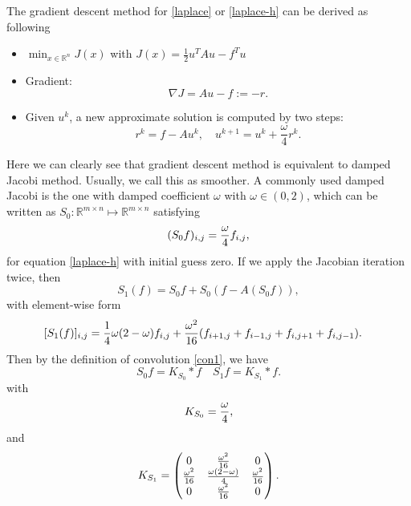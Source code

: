The gradient descent method for \eqref{laplace} or \eqref{laplace-h} can be derived as following 
\begin{itemize}
	\item $\min_{x\in \mathbb{R}^n} J(x)$ with $ J(x) =
          \frac{1}{2}u^TA u - f^Tu$ 
	\item Gradient:
	$$
	\nabla J= Au - f := - r.
	$$
	\item Given $u^k$, a new approximate solution is computed by two steps:
	$$
	r^k = f-Au^k,\quad u^{k+1} = u^k + \frac{\omega}{4} r^k.
	$$
\end{itemize}
Here we can clearly see that gradient descent method is equivalent to damped Jacobi method. Usually, we call this as 
smoother. A commonly used 
damped Jacobi is the one with damped coefficient $\omega$ with $\omega \in (0,2)$,  
which can be written as $S_{0}:\mathbb R^{m\times n}\mapsto
\mathbb R^{m\times n}$ satisfying
\begin{equation}
\label{jacobi1}
(S_{0}f)_{i,j}={\omega\over 4}f_{i,j},
\end{equation}
for equation \eqref{laplace-h} with initial guess zero.
If we apply the Jacobian iteration twice, then
$$
S_1(f) = S_{0} f + S_0(f - A(S_{0}f)),
$$
with element-wise form
\begin{equation} 
\begin{aligned}
\label{jacobi2}
[S_1(f)]_{i,j} &={1\over 4}\omega(2-\omega)f_{i,j} + {\omega^2\over 16}(f_{i+1,j}+f_{i-1,j}+f_{i,j+1}+f_{i,j-1}).
\end{aligned}
\end{equation}
Then by the definition of convolution \eqref{con1}, we have
 \begin{equation}\label{eq:convS}
S_{0}f = K_{S_{0}} \ast f \quad S_1 f = K_{S_1} \ast f.
\end{equation}
with
\begin{equation}\label{eq:kernel-S}
K_{S_{0}} = {\omega \over 4},
\end{equation}
and 
\begin{equation}\label{eq:kernel-S2}
K_{S_1} = \begin{pmatrix}
0 & \frac{\omega^2}{16} & 0 \\
\frac{\omega^2}{16} & {\omega(2-\omega) \over 4} & \frac{\omega^2}{16}  \\
0 & \frac{\omega^2}{16}  & 0
\end{pmatrix}.
\end{equation}






%
